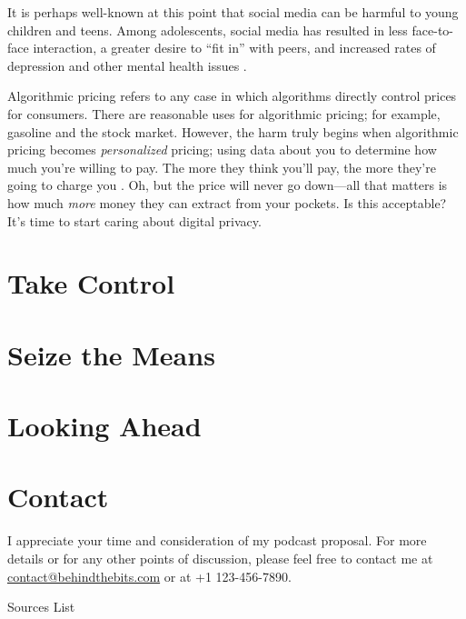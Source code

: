 \documentclass[12pt]{article}
\begin{document}
It is perhaps well-known at this point that social media can be harmful to young
children and teens. Among adolescents, social media has resulted in less
face-to-face interaction, a greater desire to ``fit in'' with peers, and
increased rates of depression and other mental health issues \autocite{Allen2019:Social}.

Algorithmic pricing refers to any case in which algorithms directly control
prices for consumers. There are reasonable uses for algorithmic pricing; for
example, gasoline and the stock market. However, the harm truly begins when
algorithmic pricing becomes \emph{personalized} pricing; using data about you to
determine how much you're willing to pay. The more they think you'll pay, the
more they're going to charge you \autocite{Bar-Gill2019:Symposium}. Oh, but the
price will never go down---all that matters is how much \emph{more} money they
can extract from your pockets. Is this acceptable? It's time to start caring
about digital privacy.

\section{Take Control}

\section{Seize the Means}


\section*{Looking Ahead}

\section*{Contact}
I appreciate your time and consideration of my podcast proposal. For more
details or for any other points of discussion, please feel free to contact me at
\href{mailto:contact@behindthebits.com}{contact@behindthebits.com} or at +1 123-456-7890.

\clearpage
\begin{center}
  Sources List
\end{center}
\printbibliography[title={\relax}]
\end{document}
